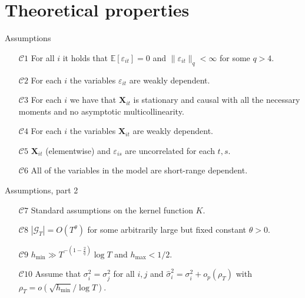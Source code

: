 \documentclass[10pt, handout]{beamer}
\newcommand{\E}{\mathbb{E}}
\newcommand{\X}{\boldsymbol{X}}
\begin{document}
\section{Theoretical properties}




\begin{frame}[label = frame_assumptions]{Assumptions}
\begin{itemize}

\item[$\mathcal{C}1$] \label{C-err1} For all $i$ it holds that $\E[\varepsilon_{it}] =0$ and $\| \varepsilon_{it} \|_q < \infty$ for some $q > 4$.\pause
\item[$\mathcal{C}2$] For each $i$ the variables $\varepsilon_{it}$ are weakly dependent. \hyperlink{tech_assumptions}{}\pause

\item[$\mathcal{C}3$] \label{C-reg} For each $i$ we have that $\X_{it}$ is stationary and causal with all the necessary moments and no asymptotic multicollinearity.\pause

\item[$\mathcal{C}4$] For each $i$ the variables $\X_{it}$ are weakly dependent. \hyperlink{tech_assumptions_2}{}\pause
\item[$\mathcal{C}5$]  $\X_{it}$ (elementwise) and $\varepsilon_{is}$ are uncorrelated for each $t, s$.\pause

\item[$\mathcal{C}6$] All of the variables in the model are short-range dependent.\hyperlink{tech_assumptions_3}{}\pause

\end{itemize}
\end{frame}

\begin{frame}{Assumptions, part 2}
\begin{itemize}


\item[$\mathcal{C}7$]\label{C-ker} Standard assumptions on the kernel function $K$. \pause

\item[$\mathcal{C}8$] \label{C-grid} $|\mathcal{G}_T| = O(T^\theta)$ for some arbitrarily large but fixed constant $\theta > 0$.\pause
{}\pause
\item[$\mathcal{C}9$] \label{C-h} $h_{\min} \gg T^{-(1-\frac{2}{q})} \log T$ and $h_{\max} <1/2$.\pause
\item[$\mathcal{C}10$] Assume that $\sigma_i^2 = \sigma_j^2$ for all $i, j$ and $\widehat{\sigma}_i^2 = \sigma_i^2 + o_p(\rho_T)$ with $\rho_T = o(\sqrt{h_{\min}}/\log T)$.
\end{itemize}
\end{frame}
\end{document}
